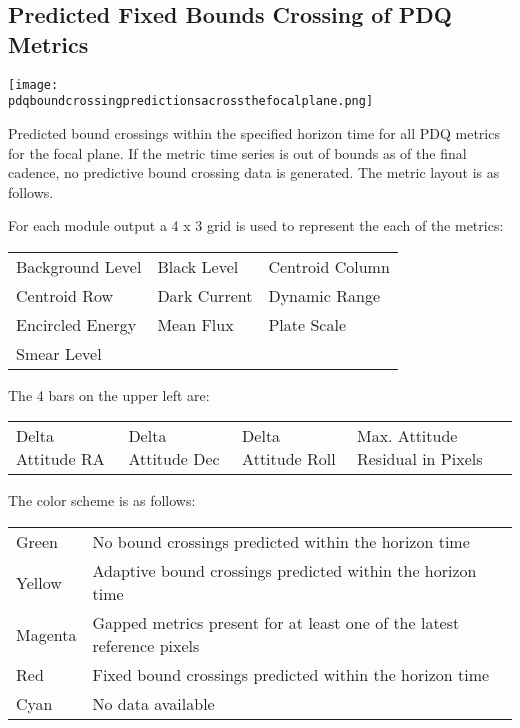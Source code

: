 \clearpage

\subsection{Predicted Fixed Bounds Crossing of PDQ Metrics}

\ifdefined \pdqboundcrossingpredictionsacrossthefocalplane

\begin{center}
  \texttt{[image: \\pdqboundcrossingpredictionsacrossthefocalplane.png]}
\end{center}

Predicted bound crossings within the specified horizon time for all
PDQ metrics for the focal plane. If the metric time series is out of
bounds as of the final cadence, no predictive bound crossing data is
generated. The metric layout is as follows.

For each module output a 4 x 3 grid is used to represent the each of
the metrics:

\begin{tabular*}{\tablewidth}{l l l}
  Background Level & Black Level & Centroid Column\\
  Centroid Row & Dark Current & Dynamic Range\\
  Encircled Energy & Mean Flux & Plate Scale\\
  Smear Level\\
\end{tabular*}

The  4 bars on the upper left are:

\begin{tabular*}{\tablewidth}{l l l l}
  Delta Attitude RA & Delta Attitude Dec & Delta Attitude Roll & Max. Attitude Residual in Pixels\\
\end{tabular*}

The color scheme is as follows:

\begin{tabular*}{\tablewidth}{l l}
  Green & No bound crossings predicted within the horizon time\\
  Yellow & Adaptive bound crossings predicted within the horizon time\\
  Magenta & Gapped metrics present for at least one of the latest reference pixels\\
  Red & Fixed bound crossings predicted  within the horizon time\\
  Cyan & No data available\\
\end{tabular*}

